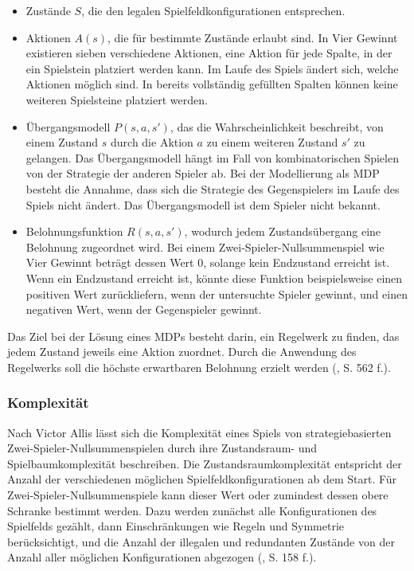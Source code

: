 \begin{itemize}
	
\item Zustände $S$, die den legalen Spielfeldkonfigurationen entsprechen.
\item Aktionen $A(s)$, die für bestimmte Zustände erlaubt sind. In Vier Gewinnt existieren sieben verschiedene Aktionen, eine Aktion für jede Spalte, in der ein Spielstein platziert werden kann. Im Laufe des Spiels ändert sich, welche Aktionen möglich sind. In bereits vollständig gefüllten Spalten können keine weiteren Spielsteine platziert werden.
\item Übergangsmodell $P(s, a, s')$, das die Wahrscheinlichkeit beschreibt, von einem Zustand $s$ durch die Aktion $a$ zu einem weiteren Zustand $s'$ zu gelangen. Das Übergangsmodell hängt im Fall von kombinatorischen Spielen von der Strategie der anderen Spieler ab. Bei der Modellierung als MDP besteht die Annahme, dass sich die Strategie des Gegenspielers im Laufe des Spiels nicht ändert. Das Übergangsmodell ist dem Spieler nicht bekannt.
\item Belohnungsfunktion $R(s, a, s')$, wodurch jedem Zustandsübergang eine Belohnung zugeordnet wird. Bei einem Zwei-Spieler-Nullsummenspiel wie Vier Gewinnt beträgt dessen Wert 0, solange kein Endzustand erreicht ist. Wenn ein Endzustand erreicht ist, könnte diese Funktion beispielsweise einen positiven Wert zurückliefern, wenn der untersuchte Spieler gewinnt, und einen negativen Wert, wenn der Gegenspieler gewinnt.

\end{itemize}

Das Ziel bei der Lösung eines MDPs besteht darin, ein Regelwerk zu finden, das jedem Zustand jeweils eine Aktion zuordnet. Durch die Anwendung des Regelwerks soll die höchste erwartbaren Belohnung erzielt werden (\cite{Russell.2020}, S. 562 f.).

\subsubsection{Komplexität}

Nach Victor Allis lässt sich die Komplexität eines Spiels von strategiebasierten Zwei-Spieler-Nullsummenspielen durch ihre Zustandsraum- und Spielbaumkomplexität beschreiben. Die Zustandsraumkomplexität entspricht der Anzahl der verschiedenen möglichen Spielfeldkonfigurationen ab dem Start. Für Zwei-Spieler-Nullsummenspiele kann dieser Wert oder zumindest dessen obere Schranke bestimmt werden. Dazu werden zunächst alle Konfigurationen des Spielfelds gezählt, dann Einschränkungen wie Regeln und Symmetrie berücksichtigt, und die Anzahl der illegalen und redundanten Zustände von der Anzahl aller möglichen Konfigurationen abgezogen (\cite{Allis.1994}, S. 158 f.).

